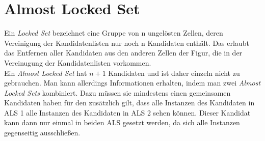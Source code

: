 \newpage
\section{Almost Locked Set}
Ein \textit{Locked Set} bezeichnet eine Gruppe von n ungelösten Zellen, deren Vereinigung der Kandidatenlisten nur noch n Kandidaten enthält. Das erlaubt das Entfernen aller Kandidaten aus den anderen Zellen der Figur, die in der Vereinugung der Kandidatenlisten vorkommen.\\
Ein \textit{Almost Locked Set} hat $n+1$ Kandidaten und ist daher einzeln nicht zu gebrauchen. Man kann allerdings Informationen erhalten, indem man zwei \textit{Almost Locked Sets} kombiniert. Dazu müssen sie mindestens einen gemeinsamen Kandidaten haben für den zusätzlich gilt, dass alle Instanzen des Kandidaten in ALS 1 alle Instanzen des Kandidaten in ALS 2 sehen können. Dieser Kandidat kann dann nur einmal in beiden ALS gesetzt werden, da sich alle Instanzen gegenseitig ausschließen.